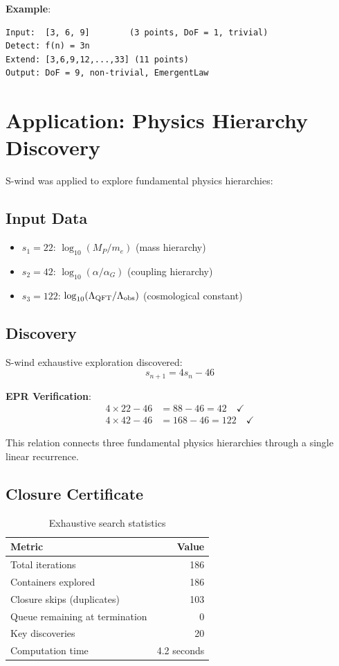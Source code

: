 \documentclass[11pt,a4paper]{article}
\begin{document}
\textbf{Example}:
\begin{verbatim}
Input:  [3, 6, 9]        (3 points, DoF = 1, trivial)
Detect: f(n) = 3n
Extend: [3,6,9,12,...,33] (11 points)
Output: DoF = 9, non-trivial, EmergentLaw
\end{verbatim}

\section{Application: Physics Hierarchy Discovery}

S-wind was applied to explore fundamental physics hierarchies:

\subsection{Input Data}

\begin{itemize}
    \item $s_1 = 22$: $\log_{10}(M_P/m_e)$ (mass hierarchy)
    \item $s_2 = 42$: $\log_{10}(\alpha/\alpha_G)$ (coupling hierarchy)
    \item $s_3 = 122$: $\log_{10}(\Lambda_{\rm QFT}/\Lambda_{\rm obs})$ 
    (cosmological constant)
\end{itemize}

\subsection{Discovery}

S-wind exhaustive exploration discovered:
\begin{equation}
\boxed{s_{n+1} = 4s_n - 46}
\end{equation}

\textbf{EPR Verification}:
\begin{align}
4 \times 22 - 46 &= 88 - 46 = 42 \quad \checkmark \nonumber\\
4 \times 42 - 46 &= 168 - 46 = 122 \quad \checkmark
\end{align}

This relation connects three fundamental physics hierarchies through a single 
linear recurrence.

\subsection{Closure Certificate}

\begin{table}[h]
\centering
\begin{tabular}{|l|r|}
\hline
\textbf{Metric} & \textbf{Value} \\
\hline
Total iterations & 186 \\
Containers explored & 186 \\
Closure skips (duplicates) & 103 \\
Queue remaining at termination & 0 \\
Key discoveries & 20 \\
Computation time & 4.2 seconds \\
\hline
\end{tabular}
\caption{Exhaustive search statistics}
\end{table}
\end{document}
